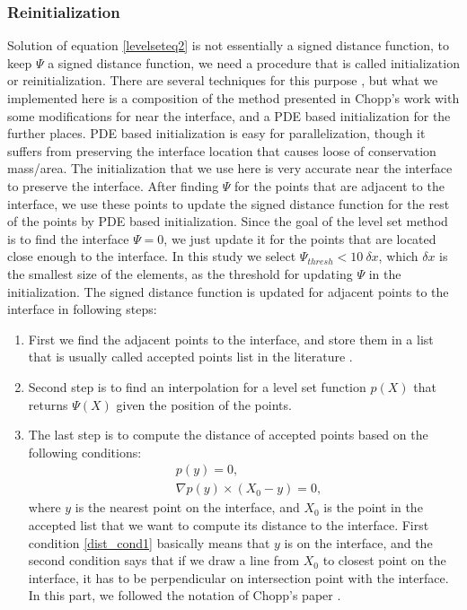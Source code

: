 \documentclass[letterpaper,10pt]{article}
\begin{document}
\subsubsection{Reinitialization} \label{reinitialization}
Solution of equation \eqref{levelseteq2} is not essentially a signed distance function, to keep $\varPsi$ a signed distance function, we need a procedure that is called initialization or reinitialization. There are several techniques for this purpose \cite{Osher1988}, but what we implemented here is a composition of the method presented in Chopp's work \cite{Chopp2001} with some modifications for near the interface, and a PDE based initialization for the further places\cite{Sussman1994a}.
PDE based initialization is easy for parallelization, though it suffers from preserving the interface location that causes loose of conservation mass/area. The initialization that we use here is very accurate near the interface to preserve the interface. After finding $\varPsi$ for the points that are adjacent to the interface, we use these points to update the signed distance function for the rest of the points by PDE based initialization. Since the goal of the level set method is to find the interface $\varPsi=0$, we just update it for the points that are located close enough to the interface. In this study we select $\varPsi_{thresh}<10\ \delta x$, which  $\delta x$ is the smallest size of the elements, as the threshold for updating $\varPsi$ in the initialization.
The signed distance function is updated for adjacent points to the interface in following steps:
\begin{enumerate}
\item First we find the adjacent points to the interface, and store them in a list that is usually called accepted points list in the literature \cite{Chopp2001}. 
\item Second step is to find an interpolation for a level set function $p(X)$ that returns $\varPsi(X)$ given the position of the points. 
\item The last step is to compute the distance of accepted points based on the following conditions:
\begin{subequations}
\begin{align}
&p(y)=0,\label{dist_cond1} \\ 
&\nabla p(y) \times (X_0-y)=0,\label{dist_cond2}
\end{align}
\end{subequations}
where $y$ is the nearest point on the interface, and $X_0$ is the point in the accepted list that we want to compute its distance to the interface. First condition \eqref{dist_cond1} basically means that $y$ is on the interface, and the second condition says that if we draw a line from $X_0$ to closest point on the interface, it has to be perpendicular on intersection point with the interface. In this part, we followed the notation of Chopp's paper \citep{Chopp2001}.
\end{enumerate}
\end{document}

